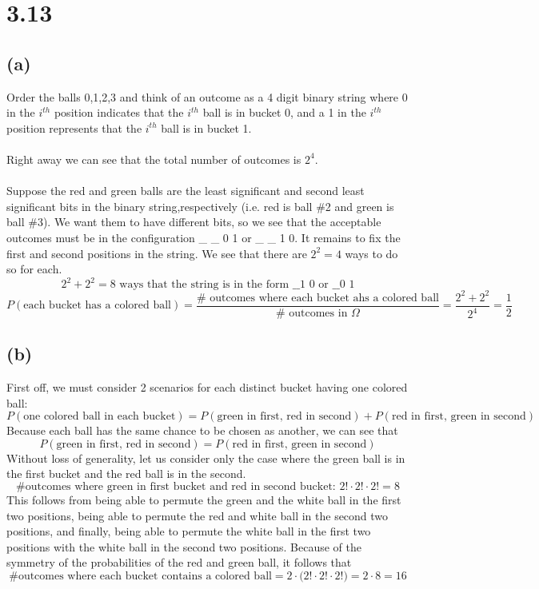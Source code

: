 \documentclass[11pt]{article}
\begin{document}
\section*{3.13}
\subsection*{(a)}
Order the balls 0,1,2,3 and think of an outcome as a 4 digit binary string where 0 in the $i^{th}$ position indicates that the $i^{th}$ ball is in bucket 0, and a 1 in the $i^{th}$ position represents that the $i^{th}$ ball is in bucket 1. \\ \\
Right away we can see that the total number of outcomes is $2^4$. \\ \\
Suppose the red and green balls are the least significant and second least significant bits in the binary string,respectively (i.e. red is ball \#2 and green is ball \#3). We want them to have different bits, so we see that the acceptable outcomes must be in the configuration \_ \_ 0 1 or \_ \_ 1 0. It remains to fix the first and second positions in the string. We see that there are $2^2=4$ ways to do so for each.
\[2^2+2^2=8\text{ ways that the string is in the form \_ \_ 1 0 or \_ \_ 0 1}\]
\[P(\text{each bucket has a colored ball})=\frac{\#\text{ outcomes where each bucket ahs a colored ball}}{\#\text{ outcomes in }\Omega}=\frac{2^2+2^2}{2^4}=\frac{1}{2}\]
\subsection*{(b)}
First off, we must consider 2 scenarios for each distinct bucket having one colored ball:
\[P(\text{one colored ball in each bucket})=P(\text{green in first, red in second})+P(\text{red in first, green in second})\]
Because each ball has the same chance to be chosen as another, we can see that
\[P(\text{green in first, red in second})=P(\text{red in first, green in second})\]
Without loss of generality, let us consider only the case where the green ball is in the first bucket and the red ball is in the second.
\[\text{\# outcomes where green in first bucket and red in second bucket: }2!\cdot2!\cdot2!=8\]
This follows from being able to permute the green and the white ball in the first two positions, being able to permute the red and white ball in the second two positions, and finally, being able to permute the white ball in the first two positions with the white ball in the second two positions. Because of the symmetry of the probabilities of the red and green ball, it follows that
\[\text{\# outcomes where each bucket contains a colored ball}=2\cdot\big(2!\cdot 2!\cdot 2!\big)=2\cdot 8=16\]
\end{document}
